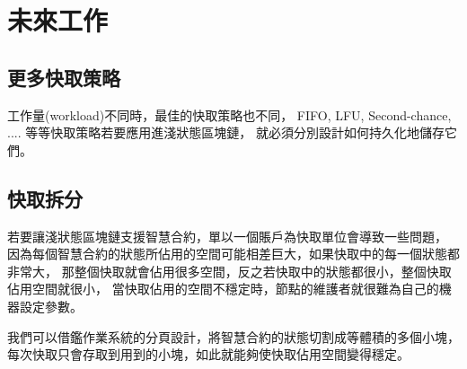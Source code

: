 \chapter{未來工作}
\label{c:future_work}

\section{更多快取策略}
工作量(workload)不同時，最佳的快取策略也不同，
FIFO, LFU, Second-chance, .... 等等快取策略若要應用進淺狀態區塊鏈，
就必須分別設計如何持久化地儲存它們。

\section{快取拆分}

若要讓淺狀態區塊鏈支援智慧合約，單以一個賬戶為快取單位會導致一些問題，
因為每個智慧合約的狀態所佔用的空間可能相差巨大，如果快取中的每一個狀態都非常大，
那整個快取就會佔用很多空間，反之若快取中的狀態都很小，整個快取佔用空間就很小，
當快取佔用的空間不穩定時，節點的維護者就很難為自己的機器設定參數。

我們可以借鑑作業系統的分頁設計，將智慧合約的狀態切割成等體積的多個小塊，
每次快取只會存取到用到的小塊，如此就能夠使快取佔用空間變得穩定。

